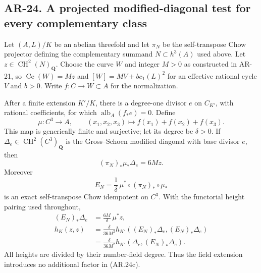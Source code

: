 \subsection*{AR-24. A projected modified-diagonal test for every complementary class}

\begin{proposition}[AR-24]
Let $(A,L)/K$ be an abelian threefold and let $\pi_N$ be the
self-transpose Chow projector defining the complementary summand
$N\subset h^3(A)$ used above.  Let $z\in\operatorname{CH}^2(N)_\mathbf Q$.
Choose the curve $W$ and integer $M>0$ as constructed in AR-21,
so $\operatorname{Ce}(W)=Mz$ and
$[W]=MV+b c_1(L)^2$ for an effective rational cycle $V$ and $b>0$.
Write $f:C\to W\subset A$ for the normalization.

After a finite extension $K'/K$, there is a degree-one divisor $e$ on
$C_{K'}$, with rational coefficients, for which
$\operatorname{alb}_A(f_*e)=0$.  Define
\[
 \mu:C^3\longrightarrow A,\qquad
 (x_1,x_2,x_3)\longmapsto f(x_1)+f(x_2)+f(x_3).
\]
This map is generically finite and surjective; let its degree be
$\delta>0$.  If $\Delta_e\in\operatorname{CH}^2(C^3)_\mathbf Q$ is
the Gross--Schoen modified diagonal with base divisor $e$, then
\[
 (\pi_N)_*\mu_*\Delta_e=6Mz.                         \tag{AR.24a}
\]
Moreover
\[
 E_N=\frac1\delta\,\mu^*\circ(\pi_N)_*\circ\mu_*
                                                        \tag{AR.24b}
\]
is an exact self-transpose Chow idempotent on $C^3$.  With the
functorial height pairing used throughout,
\[
 \begin{split}
 (E_N)_*\Delta_e&=\frac{6M}{\delta}\,\mu^*z,\\
 h_K(z,z)
 &=\frac{\delta}{36M^2}
       h_{K'}((E_N)_*\Delta_e,(E_N)_*\Delta_e)\\
 &=\frac{\delta}{36M^2}
       h_{K'}(\Delta_e,(E_N)_*\Delta_e).
 \end{split}                                             \tag{AR.24c}
\]
All heights are divided by their number-field degree.  Thus the field
extension introduces no additional factor in (AR.24c).
\end{proposition}

